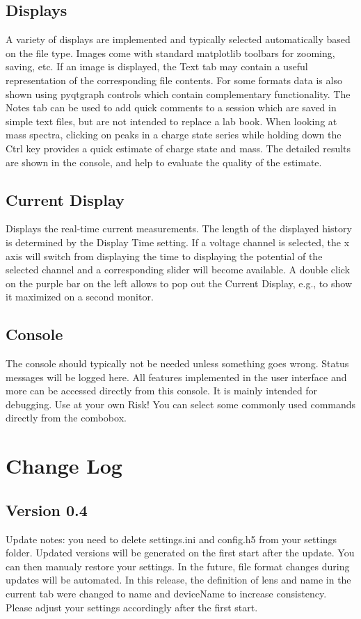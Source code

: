 \documentclass[a4paper,11pt,DIV=13]{scrartcl}
\begin{document}
\subsection{Displays}
A variety of displays are implemented and typically selected automatically based on the file type. Images come with standard matplotlib toolbars for zooming, saving, etc. If an image is displayed, the Text tab may contain a useful representation of the corresponding file contents. For some formats data is also shown using pyqtgraph controls which contain complementary functionality. The Notes tab can be used to add quick comments to a session which are saved in simple text files, but are not intended to replace a lab book. When looking at mass spectra, clicking on peaks in a charge state series while holding down the Ctrl key provides a quick estimate of charge state and mass. The detailed results are shown in the console, and help to evaluate the quality of the estimate.

\subsection{Current Display}
Displays the real-time current measurements. The length of the displayed history is determined by the Display Time setting. If a voltage channel is selected, the x axis will switch from displaying the time to displaying the potential of the selected channel and a corresponding slider will become available. A double click on the purple bar on the left allows to pop out the Current Display, e.g., to show it maximized on a second monitor. 

\subsection{Console}
The console should typically not be needed unless something goes wrong. Status messages will be logged here.
All features implemented in the user interface and more can be accessed directly from this console.
It is mainly intended for debugging. Use at your own Risk! You can select some commonly used commands directly from the combobox.


\section{Change Log}


\subsection*{Version 0.4}
Update notes: you need to delete settings.ini and config.h5 from your settings folder. Updated versions will be generated on the first start after the update. You can then manualy restore your settings. In the future, file format changes during updates will be automated. 
In this release, the definition of lens and name in the current tab were changed to name and deviceName to increase consistency. Please adjust your settings accordingly after the first start.
\end{document}

